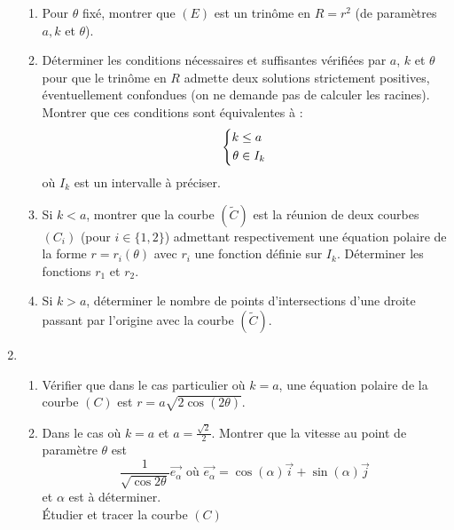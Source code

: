 \begin{enumerate}
\begin{enumerate}
\item Pour $\theta$ fixé, montrer que $(E)$ est un trinôme en $R=r^2$ (de paramètres $a, k$ et $\theta$).
\item Déterminer les conditions nécessaires et suffisantes vérifiées par $a$, $k$ et 
$\theta$ pour que le trinôme en $R$ admette deux solutions strictement positives, éventuellement confondues (on ne demande pas de calculer les racines).\\
Montrer que ces conditions sont équivalentes à :
$$
  \left\lbrace 
    \begin{aligned}
       k &\leq a \\ 
       \theta &\in I_k
    \end{aligned}
 \right.
 $$
où $I_k$ est un intervalle à préciser.
\item Si  $k< a$, montrer que la courbe $(\tilde{C})$ est la réunion de deux courbes $(C_i)$ (pour $i\in\{1,2\}$) admettant respectivement une équation polaire de la forme $r=r_i(\theta)$ avec $r_i$ une fonction définie sur $I_k$. Déterminer les fonctions $r_1$ et $r_2$.
\item Si $k>a$, déterminer le nombre de points d'intersections d'une droite passant par 
l'origine avec la courbe $(\tilde{C})$.
\end{enumerate}
\item
\begin{enumerate}
\item Vérifier que dans le cas particulier où $k= a$, une équation polaire de la courbe $(C)$ est $r=a\sqrt{2\cos(2\theta)}$.
\item Dans le cas où $k= a$ et $a=\frac{\sqrt{2}}{2}$. Montrer que la vitesse au point de paramètre $\theta$ est $$\frac{1}{\sqrt{\cos 2\theta}}\overrightarrow{e_{\alpha}} \text{ où }
\overrightarrow{e_{\alpha}}=\cos(\alpha)\overrightarrow{i} +\sin(\alpha)\overrightarrow{j}
$$
et $\alpha$ est à déterminer.\\  \'Etudier et tracer la courbe $(C)$ 
\end{enumerate}

\end{enumerate}

